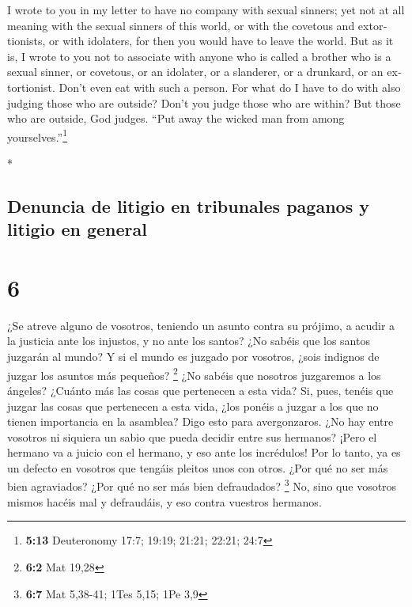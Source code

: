 \begin{paracol}{2}
\begin{otherlanguage}{english}
 I wrote to you in my letter to have no company with
sexual sinners;  yet not at all meaning with the sexual
sinners of this world, or with the covetous and extortionists, or with
idolaters, for then you would have to leave the world. 
But as it is, I wrote to you not to associate with anyone who is called
a brother who is a sexual sinner, or covetous, or an idolater, or a
slanderer, or a drunkard, or an extortionist. Don't even eat with such a
person.  For what do I have to do with also judging those
who are outside? Don't you judge those who are within? 
But those who are outside, God judges. ``Put away the wicked man from
among yourselves.''\footnote{\textbf{5:13} Deuteronomy 17:7; 19:19;
  21:21; 22:21; 24:7}

\end{otherlanguage}

\switchcolumn[0]*

\hypertarget{denuncia-de-litigio-en-tribunales-paganos-y-litigio-en-general}{%
\subsection{Denuncia de litigio en tribunales paganos y litigio en
general}\label{denuncia-de-litigio-en-tribunales-paganos-y-litigio-en-general}}

\hypertarget{section-10}{%
\section{6}\label{section-10}}

 ¿Se atreve alguno de vosotros, teniendo un asunto contra
su prójimo, a acudir a la justicia ante los injustos, y no ante los
santos?  ¿No sabéis que los santos juzgarán al mundo? Y si
el mundo es juzgado por vosotros, ¿sois indignos de juzgar los asuntos
más pequeños? \footnote{\textbf{6:2} Mat 19,28}  ¿No
sabéis que nosotros juzgaremos a los ángeles? ¿Cuánto más las cosas que
pertenecen a esta vida?  Si, pues, tenéis que juzgar las
cosas que pertenecen a esta vida, ¿los ponéis a juzgar a los que no
tienen importancia en la asamblea?  Digo esto para
avergonzaros. ¿No hay entre vosotros ni siquiera un sabio que pueda
decidir entre sus hermanos?  ¡Pero el hermano va a juicio
con el hermano, y eso ante los incrédulos!  Por lo tanto,
ya es un defecto en vosotros que tengáis pleitos unos con otros. ¿Por
qué no ser más bien agraviados? ¿Por qué no ser más bien defraudados?
\footnote{\textbf{6:7} Mat 5,38-41; 1Tes 5,15; 1Pe 3,9} 
No, sino que vosotros mismos hacéis mal y defraudáis, y eso contra
vuestros hermanos.


\end{paracol}
